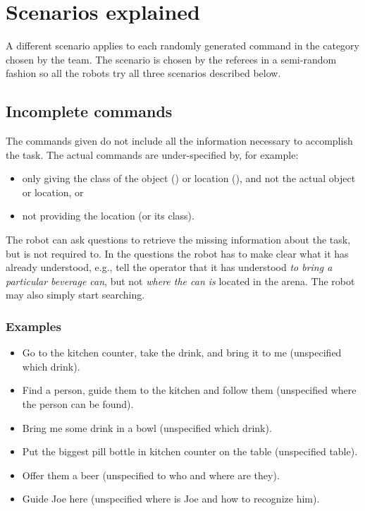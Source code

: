 %
%
\section{Scenarios explained}
\label{sec:eegpsr-categories-explained}
A different scenario applies to each randomly generated command in the category chosen by the team. The scenario is chosen by the referees in a semi-random fashion so all the robots try all three scenarios described below.


%
%
\subsection{Incomplete commands}
\label{sec:eegpsr-incomplete-command}
The commands given do not include all the information necessary to accomplish the task. The actual commands are under-specified by, for example:
\begin{itemize}
	\item only giving the class of the object () or location (), and not the actual object or location, or
	\item not providing the location (or its class).
\end{itemize}

The robot can ask questions to retrieve the missing information about the task, but is not required to. In the questions the robot has to make clear what it has already understood, e.g., tell the operator that it has understood \textit{to bring a particular beverage can}, but not \textit{where the can is} located in the arena. The robot may also simply start searching.

\subsubsection{Examples}
\begin{itemize}
	\item Go to the kitchen counter, take the drink, and bring it to me (unspecified which drink).
	\item Find a person, guide them to the kitchen and follow them (unspecified where the person can be found).
	\item Bring me some drink in a bowl (unspecified which drink).
	\item Put the biggest pill bottle in kitchen counter on the table (unspecified table).
	\item Offer them a beer (unspecified to who and where are they).
	\item Guide Joe here (unspecified where is Joe and how to recognize him).
\end{itemize}



